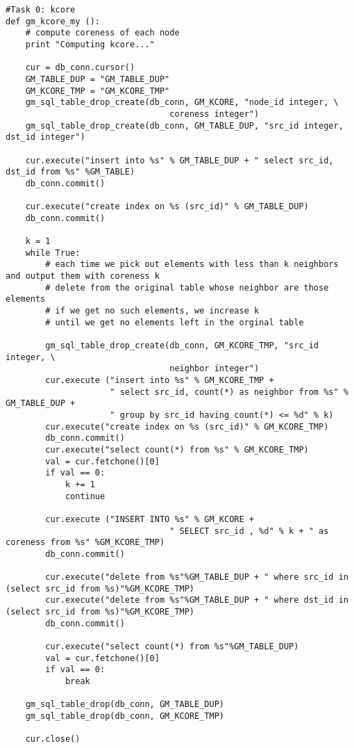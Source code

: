 \documentclass[11pt]{article}
\begin{document}
\begin{lstlisting}
#Task 0: kcore
def gm_kcore_my ():
    # compute coreness of each node
    print "Computing kcore..."
    
    cur = db_conn.cursor()
    GM_TABLE_DUP = "GM_TABLE_DUP"
    GM_KCORE_TMP = "GM_KCORE_TMP"
    gm_sql_table_drop_create(db_conn, GM_KCORE, "node_id integer, \
                                 coreness integer")
    gm_sql_table_drop_create(db_conn, GM_TABLE_DUP, "src_id integer, dst_id integer")

    cur.execute("insert into %s" % GM_TABLE_DUP + " select src_id, dst_id from %s" %GM_TABLE)
    db_conn.commit()

    cur.execute("create index on %s (src_id)" % GM_TABLE_DUP)
    db_conn.commit()

    k = 1
    while True:
        # each time we pick out elements with less than k neighbors and output them with coreness k
        # delete from the original table whose neighbor are those elements
        # if we get no such elements, we increase k
        # until we get no elements left in the orginal table

        gm_sql_table_drop_create(db_conn, GM_KCORE_TMP, "src_id integer, \
                                 neighbor integer")
        cur.execute ("insert into %s" % GM_KCORE_TMP + 
                     " select src_id, count(*) as neighbor from %s" % GM_TABLE_DUP +
                     " group by src_id having count(*) <= %d" % k)
        cur.execute("create index on %s (src_id)" % GM_KCORE_TMP)
        db_conn.commit()
        cur.execute("select count(*) from %s" % GM_KCORE_TMP)
        val = cur.fetchone()[0]
        if val == 0:
            k += 1
            continue

        cur.execute ("INSERT INTO %s" % GM_KCORE +
                                 " SELECT src_id , %d" % k + " as coreness from %s" %GM_KCORE_TMP)
        db_conn.commit()

        cur.execute("delete from %s"%GM_TABLE_DUP + " where src_id in (select src_id from %s)"%GM_KCORE_TMP)
        cur.execute("delete from %s"%GM_TABLE_DUP + " where dst_id in (select src_id from %s)"%GM_KCORE_TMP)
        db_conn.commit()  

        cur.execute("select count(*) from %s"%GM_TABLE_DUP)
        val = cur.fetchone()[0]
        if val == 0:
            break

    gm_sql_table_drop(db_conn, GM_TABLE_DUP)
    gm_sql_table_drop(db_conn, GM_KCORE_TMP)

    cur.close()


\end{lstlisting}
\end{document}
